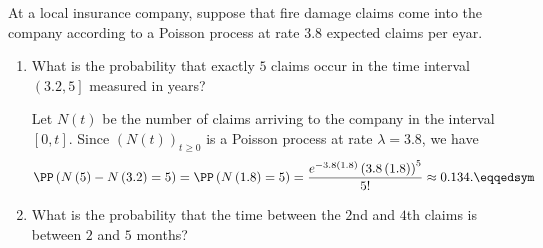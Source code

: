 \documentclass[stat333]{subfiles}
\begin{document}
    \ex At a local insurance company, suppose that fire damage claims come into the company according to a Poisson process at rate $3.8$ expected claims per eyar.
    \begin{enumerate}
        \item What is the probability that exactly $5$ claims occur in the time interval $\left( 3.2,5 \right]$ measured in years?

            \begin{subproof}[Answer]
                Let $N\left( t \right)$ be the number of claims arriving to the company in the interval $\left[ 0,t \right]$. Since $\left( N\left( t \right) \right)^{}_{t\geq 0}$ is a Poisson process at rate $\lambda=3.8$, we have
                \begin{equation*}
                    \PP\left( N\left( 5 \right)-N\left( 3.2 \right) = 5 \right) = \PP\left( N\left( 1.8 \right)=5 \right) = \frac{e^{-3.8\left( 1.8 \right)}\left( 3.8\left( 1.8 \right) \right)^5}{5!} \approx 0.134. \eqqedsym
                \end{equation*}
            \end{subproof}

        \item What is the probability that the time between the $2$nd and $4$th claims is between $2$ and $5$ months?


\end{enumerate}
\end{document}
